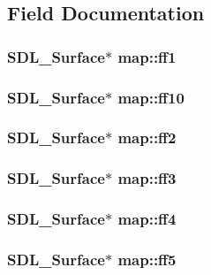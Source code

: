 \subsection{Field Documentation}
\subsubsection[{\texorpdfstring{ff1}{ff1}}]{\setlength{\rightskip}{0pt plus 5cm}S\+D\+L\+\_\+\+Surface$\ast$ map\+::ff1}\hypertarget{structmap_a59ad2fe0eba6d2c08155c88b8bf70616}{}\label{structmap_a59ad2fe0eba6d2c08155c88b8bf70616}
\subsubsection[{\texorpdfstring{ff10}{ff10}}]{\setlength{\rightskip}{0pt plus 5cm}S\+D\+L\+\_\+\+Surface$\ast$ map\+::ff10}\hypertarget{structmap_a78fcadf4e5c79c20df3863c4cf433a6b}{}\label{structmap_a78fcadf4e5c79c20df3863c4cf433a6b}
\subsubsection[{\texorpdfstring{ff2}{ff2}}]{\setlength{\rightskip}{0pt plus 5cm}S\+D\+L\+\_\+\+Surface$\ast$ map\+::ff2}\hypertarget{structmap_a58bbce138993d52fb34f9edbb2a503d0}{}\label{structmap_a58bbce138993d52fb34f9edbb2a503d0}
\subsubsection[{\texorpdfstring{ff3}{ff3}}]{\setlength{\rightskip}{0pt plus 5cm}S\+D\+L\+\_\+\+Surface$\ast$ map\+::ff3}\hypertarget{structmap_ad870601f4cd6b75d2f96aed3b420613f}{}\label{structmap_ad870601f4cd6b75d2f96aed3b420613f}
\subsubsection[{\texorpdfstring{ff4}{ff4}}]{\setlength{\rightskip}{0pt plus 5cm}S\+D\+L\+\_\+\+Surface$\ast$ map\+::ff4}\hypertarget{structmap_a316ffe59c864ed21dd9aa13b0898c3ec}{}\label{structmap_a316ffe59c864ed21dd9aa13b0898c3ec}
\subsubsection[{\texorpdfstring{ff5}{ff5}}]{\setlength{\rightskip}{0pt plus 5cm}S\+D\+L\+\_\+\+Surface$\ast$ map\+::ff5}\hypertarget{structmap_adf16263aee044b418c28efe29a20c4cb}{}\label{structmap_adf16263aee044b418c28efe29a20c4cb}

